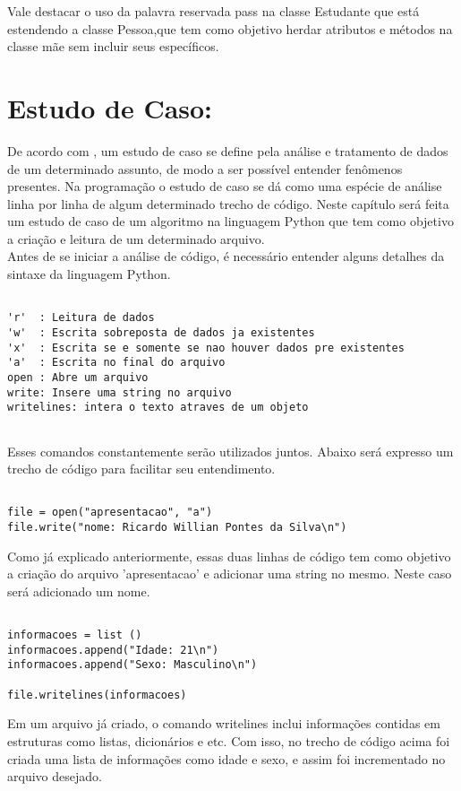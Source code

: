 Vale destacar o uso da palavra reservada pass na classe Estudante que está estendendo a classe Pessoa,que tem como objetivo herdar atributos e métodos na classe mãe sem incluir seus específicos. 
    \section{Estudo de Caso: }
De acordo com \cite{Perkovic2016}, um estudo de caso se define pela análise e tratamento de dados de um determinado assunto, de modo a ser possível entender fenômenos presentes. Na programação o estudo de caso se dá como uma espécie de análise linha por linha de algum determinado trecho de código. Neste capítulo será feita um estudo de caso de um algoritmo na linguagem Python que tem como objetivo a criação e leitura de um determinado arquivo.\\
Antes de se iniciar a análise de código, é necessário entender alguns detalhes da sintaxe da linguagem Python.
\begin{lstlisting}
 	
'r'  : Leitura de dados
'w'  : Escrita sobreposta de dados ja existentes
'x'  : Escrita se e somente se nao houver dados pre existentes
'a'  : Escrita no final do arquivo
open : Abre um arquivo
write: Insere uma string no arquivo
writelines: intera o texto atraves de um objeto 
	
\end{lstlisting}
Esses comandos constantemente serão utilizados juntos. Abaixo será expresso um trecho de código para facilitar seu entendimento.

\begin{lstlisting}

file = open("apresentacao", "a")
file.write("nome: Ricardo Willian Pontes da Silva\n")

\end{lstlisting}
Como já explicado anteriormente, essas duas linhas de código tem como objetivo a criação do arquivo 'apresentacao' e adicionar uma string no mesmo. Neste caso será adicionado um nome.
\begin{lstlisting}
	
informacoes = list ()
informacoes.append("Idade: 21\n")
informacoes.append("Sexo: Masculino\n")

file.writelines(informacoes)

\end{lstlisting} 
Em um arquivo já criado, o comando writelines inclui informações contidas em estruturas como listas, dicionários e etc. Com isso, no trecho de código acima foi criada uma lista de informações como idade e sexo, e assim foi incrementado no arquivo desejado. 